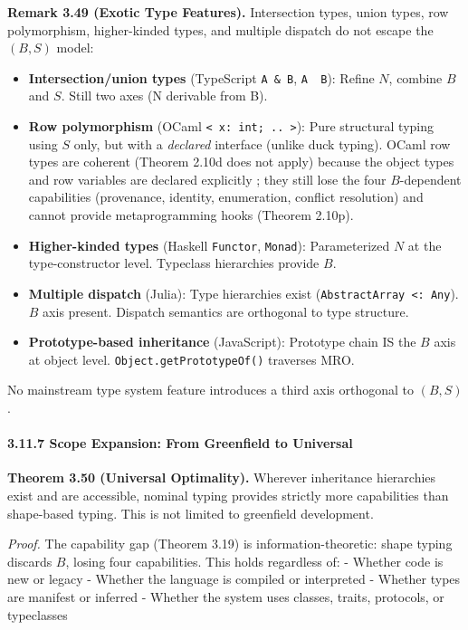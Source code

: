 \textbf{Remark 3.49 (Exotic Type Features).} Intersection types, union
types, row polymorphism, higher-kinded types, and multiple dispatch do
not escape the \((B, S)\) model:

\begin{itemize}
\tightlist
\item
  \textbf{Intersection/union types} (TypeScript \texttt{A\ \&\ B},
  \texttt{A\ \textbar{}\ B}): Refine \(N\), combine \(B\) and \(S\).
  Still two axes (N derivable from B).
\item
  \textbf{Row polymorphism} (OCaml
  \texttt{\textless{}\ x:\ int;\ ..\ \textgreater{}}): Pure structural
  typing using \(S\) only, but with a \emph{declared} interface (unlike
  duck typing). OCaml row types are coherent (Theorem 2.10d does not
  apply) because the object types and row variables are declared
  explicitly \cite{ocamlObjectsRowVars}; they still lose the four
  \(B\)-dependent capabilities
  (provenance, identity, enumeration, conflict resolution) and cannot
  provide metaprogramming hooks (Theorem 2.10p).
\item
  \textbf{Higher-kinded types} (Haskell \texttt{Functor},
  \texttt{Monad}): Parameterized \(N\) at the type-constructor level.
  Typeclass hierarchies provide \(B\).
\item
  \textbf{Multiple dispatch} (Julia): Type hierarchies exist
  (\texttt{AbstractArray\ \textless{}:\ Any}). \(B\) axis present.
  Dispatch semantics are orthogonal to type structure.
\item
  \textbf{Prototype-based inheritance} (JavaScript): Prototype chain IS
  the \(B\) axis at object level. \texttt{Object.getPrototypeOf()}
  traverses MRO.
\end{itemize}

No mainstream type system feature introduces a third axis orthogonal to
\((B, S)\).

\paragraph{3.11.7 Scope Expansion: From Greenfield to
Universal}\label{scope-expansion-from-greenfield-to-universal}

\textbf{Theorem 3.50 (Universal Optimality).} Wherever inheritance
hierarchies exist and are accessible, nominal typing provides strictly
more capabilities than shape-based typing. This is not limited to
greenfield development.

\emph{Proof.} The capability gap (Theorem 3.19) is
information-theoretic: shape typing discards \(B\), losing four
capabilities. This holds regardless of: - Whether code is new or legacy
- Whether the language is compiled or interpreted - Whether types are
manifest or inferred - Whether the system uses classes, traits,
protocols, or typeclasses


